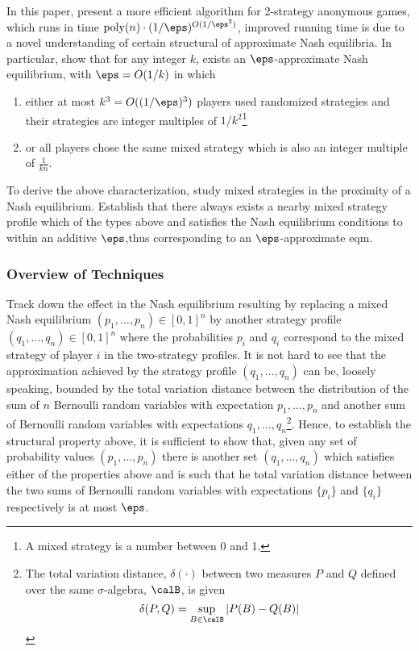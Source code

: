 In this paper, present a more efficient algorithm for 2-strategy anonymous games, which runs in time $\poly(n)\cdot(1/\eps)^{O(1/\eps^2)}$, improved running time is due to a novel understanding of certain structural of approximate Nash equilibria. In particular, show that for any integer $k$, exists an $\eps$-approximate Nash equilibrium, with $\eps = O(1/k)$ in which
\begin{enumerate}
	\item either at most $k^3 = O((1/\eps)^3)$ players used randomized strategies and their strategies are integer multiples of $1/k^2$\footnote{A mixed strategy is a number between 0 and 1.}
	\item or all players chose the same mixed strategy which is also an integer multiple of $\frac{1}{kn}$.
\end{enumerate}

To derive the above characterization, study mixed strategies in the proximity of a Nash equilibrium. Establish that there always exists a nearby mixed strategy profile which of the types above and satisfies the Nash equilibrium conditions to within an additive $\eps$,thus corresponding to an $\eps$-approximate eqm. 

\subsubsection{Overview of Techniques}

Track down the effect in the Nash equilibrium resulting by replacing a mixed Nash equilibrium $(p_1, \dots, p_n) \in [0,1]^n$ by another strategy profile $(q_1, \dots, q_n)\in [0,1]^n$ where the probabilities $p_i$ and $q_i$ correspond to the mixed strategy of player $i$ in the two-strategy profiles. It is not hard to see that the approximation achieved by the strategy profile $(q_1, \dots, q_n)$ can be, loosely speaking, bounded by the total variation distance between the distribution of the sum of $n$ Bernoulli random variables with expectation $p_1, \dots, p_n$ and another sum of Bernoulli random variables with expectations $q_1, \dots, q_n$\footnote{The total variation distance, $\delta(\cdot)$ between two measures $P$ and $Q$ defined over the same $\sigma$-algebra, $\calB$, is given \[\delta(P,Q) = \sup_{B\in\calB} |P(B)-Q(B)|\]}. Hence, to establish the structural property above, it is sufficient to show that, given any set of probability values $(p_1, \dots, p_n)$ there is another set $(q_1, \dots, q_n)$ which satisfies either of the properties above and is such that he total variation distance between the two sums of Bernoulli random variables with expectations $\{p_i\}$ and $\{q_i\}$ respectively is at most $\eps$.

